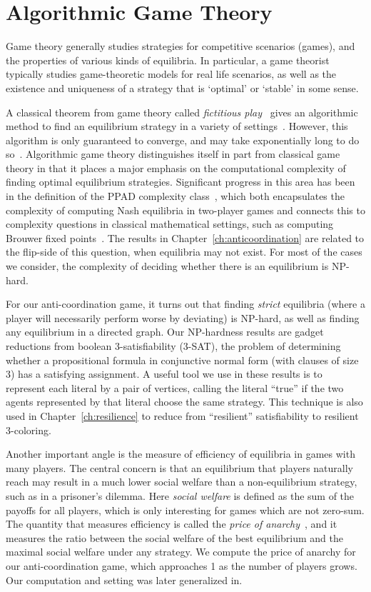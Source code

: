 \section{Algorithmic Game Theory}

Game theory generally studies strategies for competitive scenarios (games), and
the properties of various kinds of equilibria. In particular, a game theorist
typically studies game-theoretic models for real life scenarios, as well as the
existence and uniqueness of a strategy that is `optimal' or `stable' in some
sense.

A classical theorem from game theory called \emph{fictitious
play}~\cite{Robinson51} gives an algorithmic method to find an equilibrium
strategy in a variety of settings~\cite{Berger05,MondererS96,Nachbar90}.
However, this algorithm is only guaranteed to converge, and may take
exponentially long to do so~\cite{DaskalakisGP09}. Algorithmic game theory
distinguishes itself in part from classical game theory in that it places a
major emphasis on the computational complexity of finding optimal equilibrium
strategies. Significant progress in this area has been in the definition of the
PPAD complexity class~\cite{Papadimitriou94}, which both encapsulates the
complexity of computing Nash equilibria in two-player games and connects this
to complexity questions in classical mathematical settings, such as computing
Brouwer fixed points~\cite{ChenD09}. The results in
Chapter~\ref{ch:anticoordination} are related to the flip-side of this
question, when equilibria may not exist. For most of the cases we consider, the
complexity of deciding whether there is an equilibrium is NP-hard.

For our anti-coordination game, it turns out that finding \emph{strict}
equilibria (where a player will necessarily perform worse by deviating) is
NP-hard, as well as finding any equilibrium in a directed graph. Our
NP-hardness results are gadget reductions from boolean 3-satisfiability
(3-SAT), the problem of determining whether a propositional formula in
conjunctive normal form (with clauses of size 3) has a satisfying assignment. A
useful tool we use in these results is to represent each literal by a pair of
vertices, calling the literal ``true'' if the two agents represented by that
literal choose the same strategy. This technique is also used in
Chapter~\ref{ch:resilience} to reduce from ``resilient'' satisfiability to
resilient 3-coloring. 

Another important angle is the measure of efficiency of equilibria in games
with many players. The central concern is that an equilibrium that players
naturally reach may result in a much lower social welfare than a
non-equilibrium strategy, such as in a prisoner's dilemma. Here \emph{social
welfare} is defined as the sum of the payoffs for all players, which is only
interesting for games which are not zero-sum. The quantity that measures
efficiency is called the \emph{price of anarchy}~\cite{KP99}, and it measures
the ratio between the social welfare of the best equilibrium and the maximal
social welfare under any strategy. We compute the price of anarchy for our
anti-coordination game, which approaches 1 as the number of players grows. Our
computation and setting was later generalized in\cite{FeldmanF15}.

